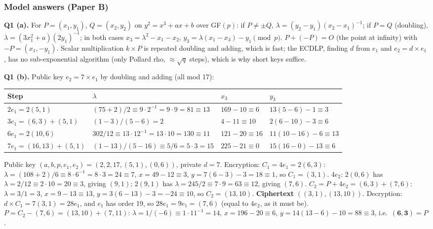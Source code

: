 \subsubsection*{Model answers (Paper B)}

\textbf{Q1 (a).} For $P = (x_1, y_1)$, $Q = (x_2, y_2)$ on $y^2 = x^3 + ax + b$ over GF$(p)$: if $P \ne \pm Q$, $\lambda = (y_2 - y_1)(x_2 - x_1)^{-1}$; if $P = Q$ (doubling), $\lambda = (3x_1^2 + a)(2y_1)^{-1}$; in both cases $x_3 = \lambda^2 - x_1 - x_2$, $y_3 = \lambda(x_1 - x_3) - y_1 \pmod p$. $P + (-P) = O$ (the point at infinity) with $-P = (x_1, -y_1)$. Scalar multiplication $k \times P$ is repeated doubling and adding, which is fast; the ECDLP, finding $d$ from $e_1$ and $e_2 = d \times e_1$, has no sub-exponential algorithm (only Pollard rho, $\approx\sqrt q$ steps), which is why short keys suffice.

\textbf{Q1 (b).} Public key $e_2 = 7 \times e_1$ by doubling and adding (all mod 17):
\begin{center}\small
\begin{tabular}{@{}llll@{}}
\toprule
Step & $\lambda$ & $x_3$ & $y_3$\\
\midrule
$2e_1 = 2(5, 1)$ & $(75 + 2)/2 \equiv 9 \cdot 2^{-1} = 9 \cdot 9 = 81 \equiv 13$ & $169 - 10 \equiv 6$ & $13(5 - 6) - 1 \equiv 3$\\
$3e_1 = (6, 3) + (5, 1)$ & $(1 - 3)/(5 - 6) = 2$ & $4 - 11 \equiv 10$ & $2(6 - 10) - 3 \equiv 6$\\
$6e_1 = 2(10, 6)$ & $302/12 \equiv 13 \cdot 12^{-1} = 13 \cdot 10 = 130 \equiv 11$ & $121 - 20 \equiv 16$ & $11(10 - 16) - 6 \equiv 13$\\
$7e_1 = (16, 13) + (5, 1)$ & $(1 - 13)/(5 - 16) \equiv 5/6 = 5 \cdot 3 = 15$ & $225 - 21 \equiv 0$ & $15(16 - 0) - 13 \equiv 6$\\
\bottomrule
\end{tabular}
\end{center}
Public key $(a, b, p, e_1, e_2) = (2, 2, 17, (5, 1), (0, 6))$, private $d = 7$.
Encryption: $C_1 = 4e_1 = 2(6, 3)$: $\lambda = (108 + 2)/6 \equiv 8 \cdot 6^{-1} = 8 \cdot 3 = 24 \equiv 7$, $x = 49 - 12 \equiv 3$, $y = 7(6 - 3) - 3 = 18 \equiv 1$, so $C_1 = (3, 1)$.
$4e_2$: $2(0, 6)$ has $\lambda = 2/12 \equiv 2 \cdot 10 = 20 \equiv 3$, giving $(9, 1)$; $2(9, 1)$ has $\lambda = 245/2 \equiv 7 \cdot 9 = 63 \equiv 12$, giving $(7, 6)$.
$C_2 = P + 4e_2 = (6, 3) + (7, 6)$: $\lambda = 3/1 = 3$, $x = 9 - 13 \equiv 13$, $y = 3(6 - 13) - 3 = -24 \equiv 10$, so $C_2 = (13, 10)$. \textbf{Ciphertext} $((3, 1), (13, 10))$.
Decryption: $d \times C_1 = 7(3, 1) = 28e_1$, and $e_1$ has order 19, so $28e_1 = 9e_1 = (7, 6)$ (equal to $4e_2$, as it must be). $P = C_2 - (7, 6) = (13, 10) + (7, 11)$: $\lambda = 1/(-6) \equiv 1 \cdot 11^{-1} = 14$, $x = 196 - 20 \equiv 6$, $y = 14(13 - 6) - 10 = 88 \equiv 3$, i.e.\ $\mathbf{(6, 3)} = P$ \checkmark.


